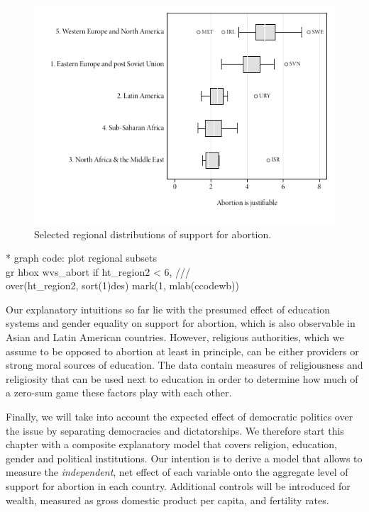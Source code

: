 \begin{figure}[htp]
	\centering
	\includegraphics[width=.9\textwidth]{images/abortion_box.pdf}

	\caption[Regional distributions of support for abortion]{\label{fig:distr}
	Selected regional distributions of support for abortion. %
  \qog}
	
\end{figure}%

\begin{docspec}
	* graph code: plot regional subsets\\%
	gr hbox wvs\_abort if ht\_region2 < 6, ///\\%
	  over(ht\_region2, sort(1)des) mark(1, mlab(ccodewb))
\end{docspec}

Our explanatory intuitions so far lie with the presumed effect of education systems and gender equality on support for abortion, which is also observable in Asian and Latin American countries. However, religious authorities, which we assume to be opposed to abortion at least in principle, can be either providers or strong moral sources of education. The data contain measures of religiousness and religiosity that can be used next to education in order to determine how much of a zero-sum game these factors play with each other.

Finally, we will take into account the expected effect of democratic politics over the issue by separating democracies and dictatorships. We therefore start this chapter with a composite explanatory model that covers religion, education, gender and political institutions. Our intention is to derive a model that allows to measure the \emph{independent}, net effect of each variable onto the aggregate level of support for abortion in each country. Additional controls will be introduced for wealth, measured as gross domestic product per capita, and fertility rates.

